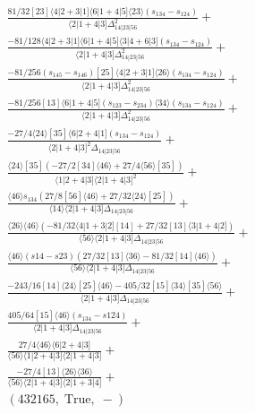 \documentclass[varwidth, border=5pt]{standalone}
\begin{document}
\begin{my}
$\begin{gathered}
\scriptscriptstyle\frac{81/32[23]⟨4|2+3|1]⟨6|1+4|5]⟨23⟩(s_{134}-s_{124})}{⟨2|1+4|3]Δ_{14|23|56}^2}+\\
\scriptscriptstyle\frac{-81/128⟨4|2+3|1]⟨6|1+4|5]⟨3|4+6|3](s_{134}-s_{124})}{⟨2|1+4|3]Δ_{14|23|56}^2}+\\
\scriptscriptstyle\frac{-81/256(s_{145}-s_{146})[25]⟨4|2+3|1]⟨26⟩(s_{134}-s_{124})}{⟨2|1+4|3]Δ_{14|23|56}^2}+\\
\scriptscriptstyle\frac{-81/256[13]⟨6|1+4|5](s_{123}-s_{234})⟨34⟩(s_{134}-s_{124})}{⟨2|1+4|3]Δ_{14|23|56}^2}+\\
\scriptscriptstyle\frac{-27/4⟨24⟩[35]⟨6|2+4|1](s_{134}-s_{124})}{⟨2|1+4|3]^2Δ_{14|23|56}}+\\
\scriptscriptstyle\frac{⟨24⟩[35](-27/2[34]⟨46⟩+27/4⟨56⟩[35])}{⟨1|2+4|3]⟨2|1+4|3]^2}+\\
\scriptscriptstyle\frac{⟨46⟩s_{134}(27/8[56]⟨46⟩+27/32⟨24⟩[25])}{⟨14⟩⟨2|1+4|3]Δ_{14|23|56}}+\\
\scriptscriptstyle\frac{⟨26⟩⟨46⟩(-81/32⟨4|1+3|2][14]+27/32[13]⟨3|1+4|2])}{⟨56⟩⟨2|1+4|3]Δ_{14|23|56}}+\\
\scriptscriptstyle\frac{⟨46⟩(s14-s23)(27/32[13]⟨36⟩-81/32[14]⟨46⟩)}{⟨56⟩⟨2|1+4|3]Δ_{14|23|56}}+\\
\scriptscriptstyle\frac{-243/16[14]⟨24⟩[25]⟨46⟩-405/32[15]⟨34⟩[35]⟨56⟩}{⟨2|1+4|3]Δ_{14|23|56}}+\\
\scriptscriptstyle\frac{405/64[15]⟨46⟩(s_{134}-s124)}{⟨2|1+4|3]Δ_{14|23|56}}+\\
\scriptscriptstyle\frac{27/4⟨46⟩⟨6|2+4|3]}{⟨56⟩⟨1|2+4|3]⟨2|1+4|3]}+\\
\scriptscriptstyle\frac{-27/4[13]⟨26⟩⟨36⟩}{⟨56⟩⟨2|1+4|3]⟨2|1+3|4]}+\\
\scriptscriptstyle(432165,\;\text{True},\;-)\phantom{+}
\end{gathered}$
\end{my}
\end{document}
